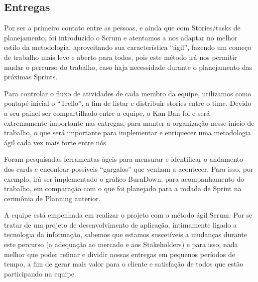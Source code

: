 \documentclass[12pt]{article}
\begin{document}
\subsection{Entregas}
Por ser a primeiro contato entre as pessoas, e ainda que com Stories/tasks de planejamento, foi introduzido o Scrum e atentamos a nos adaptar no melhor estilo da metodologia, aproveitando sua característica “ágil”, fazendo um começo de trabalho mais leve e aberto para todos, pois este método irá nos permitir mudar o percurso do trabalho, caso haja necessidade durante o planejamento das próximas Sprints.

Para controlar o fluxo de atividades de cada membro da equipe, utilizamos como pontapé inicial o “Trello”, a fim de listar e distribuir stories entre o time. Devido a seu painel ser compartilhado entre a equipe, o Kan Ban foi e será extremamente importante nas entregas, para manter a organização nesse início de trabalho, o que será importante para implementar e enriquecer uma metodologia ágil cada vez mais forte entre nós.

Foram pesquisadas ferramentas ágeis para mensurar e identificar o andamento dos cards e encontrar possíveis “gargalos” que venham a acontecer. Para isso, por exemplo, irá ser implementado o gráfico BurnDown, para acompanhamento do trabalho, em comparação com o que foi planejado para a rodada de Sprint na cerimônia de Planning anterior.

A equipe está empenhada em realizar o projeto com o método ágil Scrum. Por se tratar de um projeto de desenvolvimento de aplicação, intimamente ligado a tecnologia da informação, sabemos que estamos suscetíveis a mudanças durante este percurso (a adequação ao mercado e aos Stakeholders) e para isso, nada melhor que poder refinar e dividir nossas entregas em pequenos períodos de tempo, a fim de gerar mais valor para o cliente e satisfação de todos que estão participando na equipe.



\end{document}
